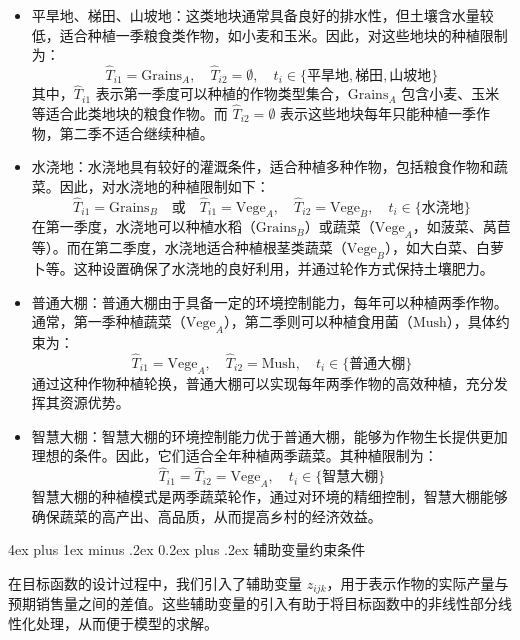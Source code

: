 \documentclass[12pt,a4paper]{nmmcm}
\makeatletter
\renewcommand\subsubsection{\@startsection{subsubsection}{3}{1em}%
  {4ex plus 1ex minus .2ex}%
  {0.2ex plus .2ex}%
  {\normalfont\large\bfseries}}
\makeatother
\begin{document}
\begin{itemize}
  \item 平旱地、梯田、山坡地：这类地块通常具备良好的排水性，但土壤含水量较低，适合种植一季粮食类作物，如小麦和玉米。因此，对这些地块的种植限制为：
        \[
          \hat{T}_{i1} = \text{Grains}_A, \quad \hat{T}_{i2} = \emptyset, \quad t_i \in \{\text{平旱地}, \text{梯田}, \text{山坡地}\}
        \]
        其中，$\hat{T}_{i1}$ 表示第一季度可以种植的作物类型集合，$\text{Grains}_A$ 包含小麦、玉米等适合此类地块的粮食作物。而 $\hat{T}_{i2} = \emptyset$ 表示这些地块每年只能种植一季作物，第二季不适合继续种植。

  \item 水浇地：水浇地具有较好的灌溉条件，适合种植多种作物，包括粮食作物和蔬菜。因此，对水浇地的种植限制如下：
        \[
          \hat{T}_{i1} = \text{Grains}_B \quad \text{或} \quad \hat{T}_{i1} = \text{Vege}_A, \quad \hat{T}_{i2} = \text{Vege}_B, \quad t_i \in \{\text{水浇地}\}
        \]
        在第一季度，水浇地可以种植水稻（$\text{Grains}_B$）或蔬菜（$\text{Vege}_A$，如菠菜、莴苣等）。而在第二季度，水浇地适合种植根茎类蔬菜（$\text{Vege}_B$），如大白菜、白萝卜等。这种设置确保了水浇地的良好利用，并通过轮作方式保持土壤肥力。

  \item 普通大棚：普通大棚由于具备一定的环境控制能力，每年可以种植两季作物。通常，第一季种植蔬菜（$\text{Vege}_A$），第二季则可以种植食用菌（$\text{Mush}$），具体约束为：
        \[
          \hat{T}_{i1} = \text{Vege}_A, \quad \hat{T}_{i2} = \text{Mush}, \quad t_i \in \{\text{普通大棚}\}
        \]
        通过这种作物种植轮换，普通大棚可以实现每年两季作物的高效种植，充分发挥其资源优势。

  \item 智慧大棚：智慧大棚的环境控制能力优于普通大棚，能够为作物生长提供更加理想的条件。因此，它们适合全年种植两季蔬菜。其种植限制为：
        \[
          \hat{T}_{i1} = \hat{T}_{i2} = \text{Vege}_A, \quad t_i \in \{\text{智慧大棚}\}
        \]
        智慧大棚的种植模式是两季蔬菜轮作，通过对环境的精细控制，智慧大棚能够确保蔬菜的高产出、高品质，从而提高乡村的经济效益。
\end{itemize}

\subsubsection{辅助变量约束条件}

在目标函数的设计过程中，我们引入了辅助变量 $z_{ijk}$，用于表示作物的实际产量与预期销售量之间的差值。这些辅助变量的引入有助于将目标函数中的非线性部分线性化处理，从而便于模型的求解。
\end{document}
